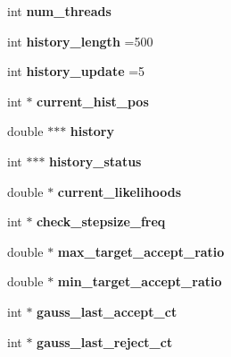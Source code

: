\begin{DoxyCompactItemize}
\item 
\mbox{\label{classsampler_a0d3c87df5d138ce4cd2286d55a54eb04}} 
int {\bfseries num\+\_\+threads}
\item 
\mbox{\label{classsampler_a19172e2dd561a1d2d77fb4557f8dfff1}} 
int {\bfseries history\+\_\+length} =500
\item 
\mbox{\label{classsampler_ae8c91af39ee6b6342becfb78b6bfc260}} 
int {\bfseries history\+\_\+update} =5
\item 
\mbox{\label{classsampler_adfa5da34ec3c754245fbb4bef9b3c14d}} 
int $\ast$ {\bfseries current\+\_\+hist\+\_\+pos}
\item 
\mbox{\label{classsampler_aaf2d81b15fe8aae0a7a4c68074b70963}} 
double $\ast$$\ast$$\ast$ {\bfseries history}
\item 
\mbox{\label{classsampler_aa5de645803117a47d82015b1e76e7674}} 
int $\ast$$\ast$$\ast$ {\bfseries history\+\_\+status}
\item 
\mbox{\label{classsampler_add57d174fcd91657e9acdddb6060905b}} 
double $\ast$ {\bfseries current\+\_\+likelihoods}
\item 
\mbox{\label{classsampler_a54e672a5ebb85d55770f07581bffd945}} 
int $\ast$ {\bfseries check\+\_\+stepsize\+\_\+freq}
\item 
\mbox{\label{classsampler_a2ee866342b0fa6b36abf5e37de2200f7}} 
double $\ast$ {\bfseries max\+\_\+target\+\_\+accept\+\_\+ratio}
\item 
\mbox{\label{classsampler_a8151e04ac80e69947f741daecd33bb0b}} 
double $\ast$ {\bfseries min\+\_\+target\+\_\+accept\+\_\+ratio}
\item 
\mbox{\label{classsampler_ab2ca885ab273b052474c5c6a50101641}} 
int $\ast$ {\bfseries gauss\+\_\+last\+\_\+accept\+\_\+ct}
\item 
\mbox{\label{classsampler_ad27db60c348826ea2305b045dee2601b}} 
int $\ast$ {\bfseries gauss\+\_\+last\+\_\+reject\+\_\+ct}

\end{DoxyCompactItemize}
